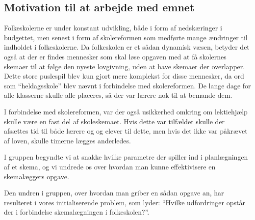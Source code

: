 \subsection{Motivation til at arbejde med emnet}
Folkeskolerne er under konstant udvikling, både i form af nedskæringer i budgettet, men senest i form af skolereformen som medførte mange ændringer til indholdet i folkeskolerne. Da folkeskolen er et sådan dynamisk væsen, betyder det også at der er findes mennesker som skal løse opgaven med at få skolernes skemaer til at følge den nyeste lovgivning, uden at have skemaer der overlapper. Dette store puslespil blev kun gjort mere komplekst for disse mennesker, da ord som ``heldagsskole'' blev nævnt i forbindelse med skolereformen. De lange dage for alle klasserne skulle alle placeres, så der var lærere nok til at bemande dem. 

I forbindelse med skolereformen, var der også usikkerhed omkring om lektiehjælp skulle være en fast del af skoleskemaet. Hvis dette var tilfældet skulle der afsættes tid til både lærere og og elever til dette, men hvis det ikke var påkrævet af loven, skulle timerne lægges anderledes. 

I gruppen begyndte vi at snakke hvilke parametre der spiller ind i planlægningen af et skema, og vi undrede os over hvordan man kunne effektivisere en skemalæggers opgave.

Den undren i gruppen, over hvordan man griber en sådan opgave an, har resulteret i vores initialiserende problem, som lyder: ``Hvilke udfordringer opstår der i forbindelse skemalægningen i folkeskolen?''.